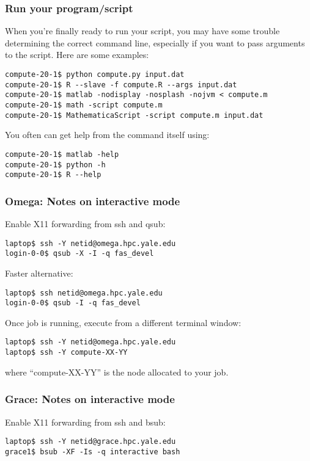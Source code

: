\documentclass[10pt]{beamer}
\begin{document}
\begin{frame}[fragile]
\frametitle{Run your program/script}
When you're finally ready to run your script, you may have some
trouble determining the correct command line, especially if you want to
pass arguments to the script.  Here are some examples:

\begin{verbatim}
compute-20-1$ python compute.py input.dat
compute-20-1$ R --slave -f compute.R --args input.dat
compute-20-1$ matlab -nodisplay -nosplash -nojvm < compute.m
compute-20-1$ math -script compute.m
compute-20-1$ MathematicaScript -script compute.m input.dat
\end{verbatim}

You often can get help from the command itself using:

\begin{verbatim}
compute-20-1$ matlab -help
compute-20-1$ python -h
compute-20-1$ R --help
\end{verbatim}
\end{frame}

\begin{frame}[fragile]
\frametitle{Omega: Notes on interactive mode}
Enable X11 forwarding from ssh and qsub:
\begin{verbatim}
laptop$ ssh -Y netid@omega.hpc.yale.edu
login-0-0$ qsub -X -I -q fas_devel
\end{verbatim}

Faster alternative:
\begin{verbatim}
laptop$ ssh netid@omega.hpc.yale.edu
login-0-0$ qsub -I -q fas_devel
\end{verbatim}

Once job is running, execute from a different terminal window:
\begin{verbatim}
laptop$ ssh -Y netid@omega.hpc.yale.edu
laptop$ ssh -Y compute-XX-YY
\end{verbatim}

where ``compute-XX-YY'' is the node allocated to your job.
\end{frame}

\begin{frame}[fragile]
\frametitle{Grace: Notes on interactive mode}
Enable X11 forwarding from ssh and bsub:
\begin{verbatim}
laptop$ ssh -Y netid@grace.hpc.yale.edu
grace1$ bsub -XF -Is -q interactive bash
\end{verbatim}
\end{frame}
\end{document}
